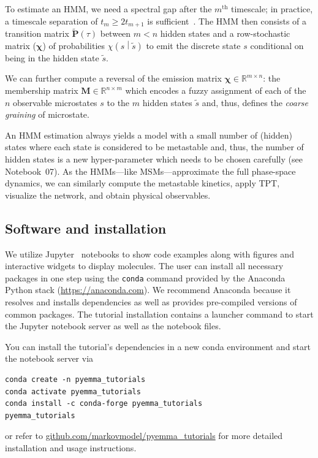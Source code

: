 \documentclass[9pt,tutorial]{livecoms}
\newcommand{\githubrepository}{\url{github.com/markovmodel/pyemma_tutorials}}
\begin{document}
To estimate an HMM, we need a spectral gap after the $m^\textrm{th}$ timescale;
in practice, a timescale separation of $t_m \geq 2t_{m+1}$ is sufficient~\cite{pyemma}.
The HMM then consists of a transition matrix $\tilde{\mathbf{P}}(\tau)$ between $m<n$ hidden states
and a row-stochastic matrix ($\bm{\chi}$) of probabilities $\chi\left( s \middle| \tilde{s} \right)$
to emit the discrete state $s$ conditional on being in the hidden state $\tilde{s}$.

We can further compute a reversal of the emission matrix $\bm{\chi}\in\mathbb{R}^{m \times n}$:
the membership matrix $\mathbf{M}\in\mathbb{R}^{n \times m}$ which encodes
a fuzzy assignment of each of the $n$ observable microstates $s$ to the $m$ hidden states $\tilde{s}$ and,
thus, defines the \emph{coarse graining} of microstate.

An HMM estimation always yields a model with a small number of (hidden) states
where each state is considered to be metastable and,
thus, the number of hidden states is a new hyper-parameter which needs to be chosen carefully (see Notebook~07).
As the HMMs---like MSMs---approximate the full phase-space dynamics,
we can similarly compute the metastable kinetics, apply TPT, visualize the network, and obtain physical observables.

\subsection{Software and installation}

We utilize Jupyter~\cite{jupyter} notebooks to show code examples along with figures and interactive widgets to display molecules.
The user can install all necessary packages in one step using the \texttt{conda} command provided by the Anaconda Python stack (\url{https://anaconda.com}).
We recommend Anaconda because it resolves and installs dependencies as well as provides pre-compiled versions of common packages.
The tutorial installation contains a launcher command to start the Jupyter notebook server as well as the notebook files.

You can install the tutorial's dependencies in a new conda environment and start the notebook server via
\begin{verbatim}
conda create -n pyemma_tutorials
conda activate pyemma_tutorials
conda install -c conda-forge pyemma_tutorials
pyemma_tutorials
\end{verbatim}
or refer to \githubrepository{} for more detailed installation and usage instructions.
\end{document}
